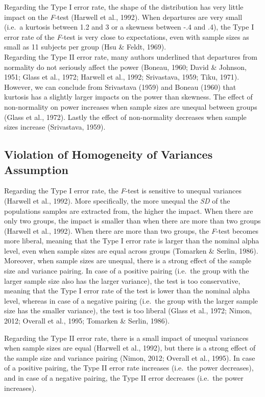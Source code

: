 \documentclass[man,floatsintext]{apa6}
\begin{document}
Regarding the Type I error rate, the shape of the distribution has very little impact on the \emph{F}-test (Harwell et al., 1992). When departures are very small (i.e.~a kurtosis between 1.2 and 3 or a skewness between -.4 and .4), the Type I error rate of the \emph{F}-test is very close to expectations, even with sample sizes as small as 11 subjects per group (Hsu \& Feldt, 1969).\\
Regarding the Type II error rate, many authors underlined that departures from normality do not seriously affect the power (Boneau, 1960; David \& Johnson, 1951; Glass et al., 1972; Harwell et al., 1992; Srivastava, 1959; Tiku, 1971). However, we can conclude from Srivastava (1959) and Boneau (1960) that kurtosis has a slightly larger impacts on the power than skewness. The effect of non-normality on power increases when sample sizes are unequal between groups (Glass et al., 1972). Lastly the effect of non-normality decreases when sample sizes increase (Srivastava, 1959).

\hypertarget{violation-of-homogeneity-of-variances-assumption}{%
\subsection{Violation of Homogeneity of Variances Assumption}\label{violation-of-homogeneity-of-variances-assumption}}

Regarding the Type I error rate, the \emph{F}-test is sensitive to unequal variances (Harwell et al., 1992). More specifically, the more unequal the \emph{SD} of the populations samples are extracted from, the higher the impact. When there are only two groups, the impact is smaller than when there are more than two groups (Harwell et al., 1992). When there are more than two groups, the \emph{F}-test becomes more liberal, meaning that the Type I error rate is larger than the nominal alpha level, even when sample sizes are equal across groups (Tomarken \& Serlin, 1986). Moreover, when sample sizes are unequal, there is a strong effect of the sample size and variance pairing. In case of a positive pairing (i.e.~the group with the larger sample size also has the larger variance), the test is too conservative, meaning that the Type I error rate of the test is lower than the nominal alpha level, whereas in case of a negative pairing (i.e.~the group with the larger sample size has the smaller variance), the test is too liberal (Glass et al., 1972; Nimon, 2012; Overall et al., 1995; Tomarken \& Serlin, 1986).

Regarding the Type II error rate, there is a small impact of unequal variances when sample sizes are equal (Harwell et al., 1992), but there is a strong effect of the sample size and variance pairing (Nimon, 2012; Overall et al., 1995). In case of a positive pairing, the Type II error rate increases (i.e.~the power decreases), and in case of a negative pairing, the Type II error decreases (i.e.~the power increases).
\end{document}
